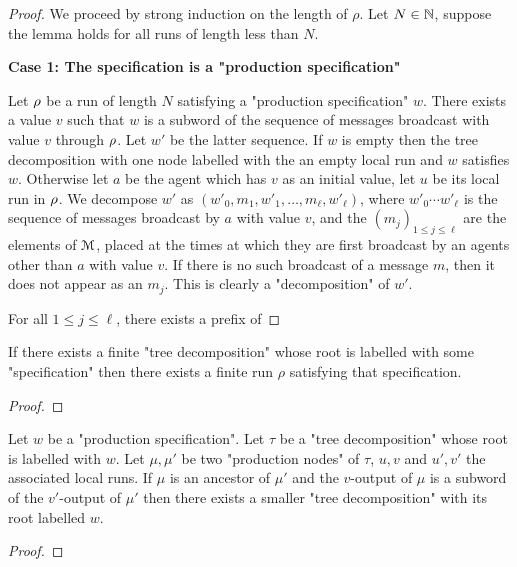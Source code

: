 \begin{proof}
	We proceed by strong induction on the length of $\rho$.
	Let $N \in \mathbb{N}$, suppose the lemma holds for all runs of length less than $N$.
	
	\textbf{Case 1: The specification is a "production specification"}
	
	Let $\rho$ be a run of length $N$ satisfying a "production specification" $w$.
	There exists a value $v$ such that $w$ is a subword of the sequence of messages broadcast with value $v$ through $\rho$. Let $w'$ be the latter sequence.
	If $w$ is empty then the tree decomposition with one node labelled with the an empty local run and $w$ satisfies $w$.	
	Otherwise let $a$ be the agent which has $v$ as an initial value, let $u$ be its local run in $\rho$. 
	We decompose $w'$ as $(w'_0, m_1, w'_1, \ldots, m_\ell, w'_\ell)$, where $w'_0\cdots w'_\ell$ is the sequence of messages broadcast by $a$ with value $v$, and the $(m_j)_{1\leq j\leq \ell}$ are the elements of $\mathcal{M}$, placed at the times at which they are first broadcast by an agents other than $a$ with value $v$. If there is no such broadcast of a message $m$, then it does not appear as an $m_j$. This is clearly a "decomposition" of $w'$.
	
	For all $1 \leq j \leq \ell$, there exists a prefix of 
\end{proof}

\begin{lemma}
	If there exists a finite "tree decomposition" whose root is labelled with some "specification" then there exists  a finite run $\rho$ satisfying that specification.
\end{lemma}

\begin{proof}
\end{proof}

\begin{lemma}
	Let $w$ be a "production specification".
	Let $\tau$ be a "tree decomposition" whose root is labelled with $w$.
	Let $\mu, \mu'$ be two "production nodes" of $\tau$, $u, v$ and $u', v'$ the associated local runs.
	If $\mu$ is an ancestor of $\mu'$ and the $v$-output of $\mu$ is a subword of the $v'$-output of $\mu'$ then there exists a smaller "tree decomposition" with its root labelled $w$.  
\end{lemma}

\begin{proof}
\end{proof}


